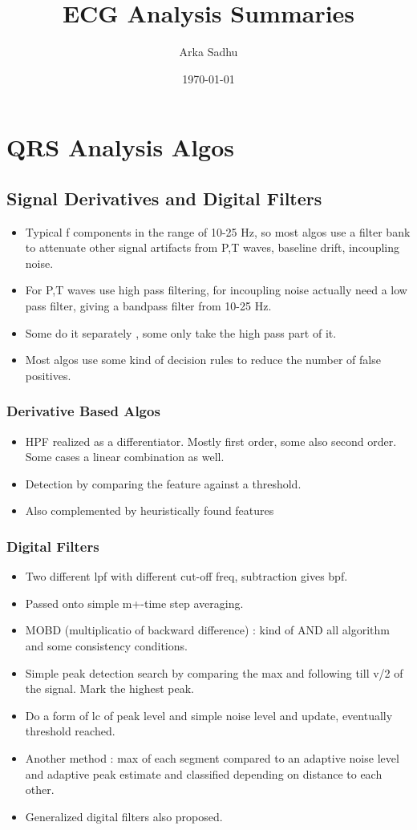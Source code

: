 \documentclass{article}
\title{ECG Analysis Summaries}
\author{
  Arka Sadhu}
\date{\today}
\begin{document}
\maketitle

\tableofcontents
\newpage

\section{QRS Analysis Algos}
\subsection{Signal Derivatives and Digital Filters}
\begin{itemize}
\item Typical f components in the range of 10-25 Hz, so most algos use a filter bank to attenuate other signal artifacts from P,T waves, baseline drift, incoupling noise.
\item For P,T waves use high pass filtering, for incoupling noise actually need a low pass filter, giving a bandpass filter from 10-25 Hz.
\item Some do it separately , some only take the high pass part of it.
\item Most algos use some kind of decision rules to reduce the number of false positives.
\end{itemize}
\subsubsection{Derivative Based Algos}
\begin{itemize}
\item HPF realized as a differentiator. Mostly first order, some also second order. Some cases a linear combination as well.
\item Detection by comparing the feature against a threshold.
\item Also complemented by heuristically found features
\end{itemize}
\subsubsection{Digital Filters}
\begin{itemize}
\item Two different lpf with different cut-off freq, subtraction gives bpf.
\item Passed onto simple m+-time step averaging.
\item MOBD (multiplicatio of backward difference) : kind of AND all algorithm  and some consistency conditions.
\item Simple peak detection search by comparing the max and following till v/2 of the signal. Mark the highest peak.
\item Do a form of lc of peak level and simple noise level and update, eventually threshold reached.
\item Another method : max of each segment compared to an adaptive noise level and adaptive peak estimate and classified depending on distance to each other.
\item Generalized digital filters also proposed.
\end{itemize}
\end{document}
